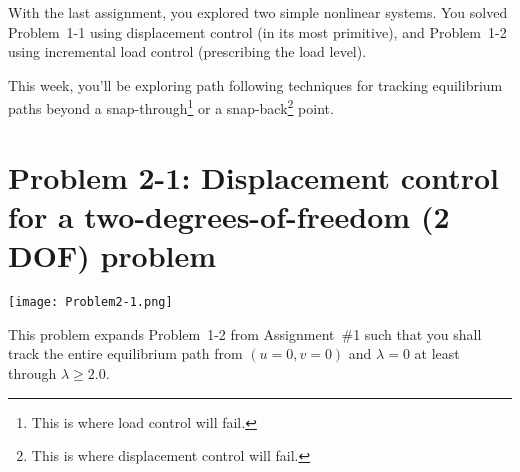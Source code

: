 \documentclass[11pt, oneside]{article}   	%
\begin{document}
\noindent
With the last assignment, you  explored two simple nonlinear systems.  You solved Problem~1-1 using displacement control (in its most primitive), and Problem~1-2 using incremental load control (prescribing the load level).

This week, you'll be exploring path following techniques for tracking equilibrium paths beyond a snap-through\footnote{This is where load control will fail.} or a snap-back\footnote{This is where displacement control will fail.} point.

\section*{Problem 2-1: Displacement control for a two-degrees-of-freedom (2 DOF) problem}

\begin{center}
\texttt{[image: Problem2-1.png]}
\end{center}
\noindent
This problem expands Problem~1-2 from Assignment~\#1 such that you shall track the entire equilibrium path from 
$(u=0, v=0)$ and $\lambda=0$ at least through $\lambda\ge 2.0$.
\end{document}
